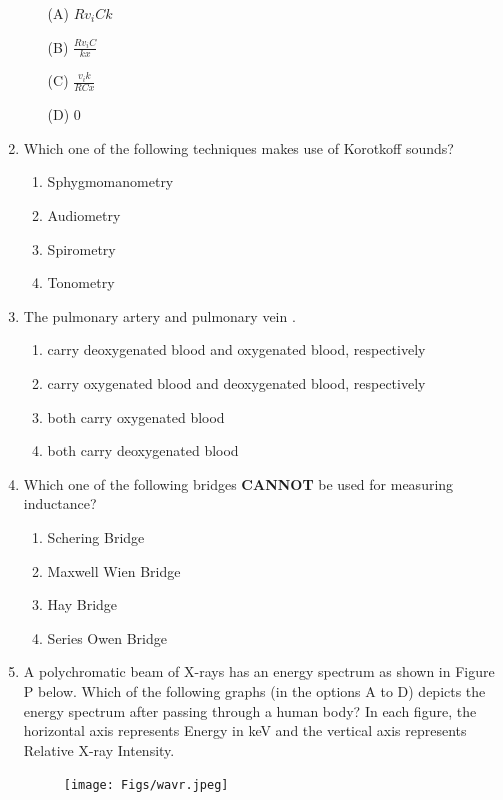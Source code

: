 \documentclass[journal]{IEEEtran}
\begin{document}
\begin{enumerate}
\begin{enumerate}
    \item[(A)] \( Rv_i Ck \)
    \item[(B)] \( \frac{Rv_i C}{kx} \)
    \item[(C)] \( \frac{v_i k}{RCx} \)
    \item[(D)] \(0\)
\end{enumerate}
\hfill{}

\item  Which one of the following techniques makes use of Korotkoff sounds?

\begin{enumerate}[label=(\Alph*)]
    \item Sphygmomanometry 
    \item Audiometry
    \item Spirometry
    \item Tonometry
\end{enumerate}
\hfill{}

\item  The pulmonary artery and pulmonary vein \underline{\hspace{3cm}}.
\begin{enumerate}[label=(\Alph*)]
    \item carry deoxygenated blood and oxygenated blood, respectively 
    \item carry oxygenated blood and deoxygenated blood, respectively
    \item both carry oxygenated blood
    \item both carry deoxygenated blood
\end{enumerate}
\hfill{}

\item  Which one of the following bridges \textbf{CANNOT} be used for measuring inductance?

\begin{enumerate}[label=(\Alph*)]
    \item Schering Bridge 
    \item Maxwell Wien Bridge
    \item Hay Bridge
    \item Series Owen Bridge
\end{enumerate}
\hfill{}


\item  A polychromatic beam of X-rays has an energy spectrum as shown in Figure P below. Which of the following graphs (in the options A to D) depicts the energy spectrum after passing through a human body? In each figure, the horizontal axis represents Energy in keV and the vertical axis represents Relative X-ray Intensity.
\begin{figure}[H]
\centering
\texttt{[image: Figs/wavr.jpeg]}
\caption{}
\end{figure}


\end{enumerate}
\end{document}
